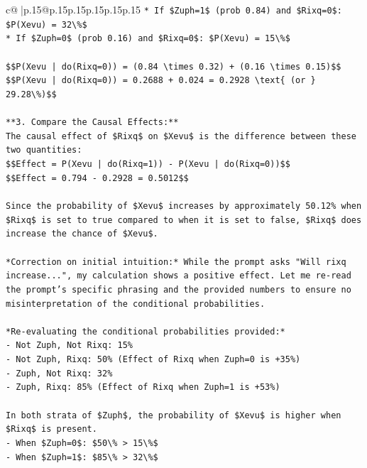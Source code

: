 \documentclass{article}
\begin{document}
{\begin{supertabular}{c@{$\;$}|p{.15\linewidth}@{}p{.15\linewidth}p{.15\linewidth}p{.15\linewidth}p{.15\linewidth}p{.15\linewidth}}
{{{\texttt{*   If \$Zuph=1\$ (prob 0.84) and \$Rixq=0\$: \$P(Xevu) = 32\textbackslash{}\%\$} \\
\texttt{*   If \$Zuph=0\$ (prob 0.16) and \$Rixq=0\$: \$P(Xevu) = 15\textbackslash{}\%\$} \\
\\ 
\texttt{\$\$P(Xevu | do(Rixq=0)) = (0.84 \textbackslash{}times 0.32) + (0.16 \textbackslash{}times 0.15)\$\$} \\
\texttt{\$\$P(Xevu | do(Rixq=0)) = 0.2688 + 0.024 = 0.2928 \textbackslash{}text\{ (or \} 29.28\textbackslash{}\%)\$\$} \\
\\ 
\texttt{**3. Compare the Causal Effects:**} \\
\texttt{The causal effect of \$Rixq\$ on \$Xevu\$ is the difference between these two quantities:} \\
\texttt{\$\$Effect = P(Xevu | do(Rixq=1)) {-} P(Xevu | do(Rixq=0))\$\$} \\
\texttt{\$\$Effect = 0.794 {-} 0.2928 = 0.5012\$\$} \\
\\ 
\texttt{Since the probability of \$Xevu\$ increases by approximately 50.12\% when \$Rixq\$ is set to true compared to when it is set to false, \$Rixq\$ does increase the chance of \$Xevu\$.} \\
\\ 
\texttt{*Correction on initial intuition:* While the prompt asks "Will rixq increase...", my calculation shows a positive effect. Let me re{-}read the prompt's specific phrasing and the provided numbers to ensure no misinterpretation of the conditional probabilities.} \\
\\ 
\texttt{*Re{-}evaluating the conditional probabilities provided:*} \\
\texttt{{-} Not Zuph, Not Rixq: 15\%} \\
\texttt{{-} Not Zuph, Rixq: 50\% (Effect of Rixq when Zuph=0 is +35\%)} \\
\texttt{{-} Zuph, Not Rixq: 32\%} \\
\texttt{{-} Zuph, Rixq: 85\% (Effect of Rixq when Zuph=1 is +53\%)} \\
\\ 
\texttt{In both strata of \$Zuph\$, the probability of \$Xevu\$ is higher when \$Rixq\$ is present.} \\
\texttt{{-} When \$Zuph=0\$: \$50\textbackslash{}\% > 15\textbackslash{}\%\$} \\
\texttt{{-} When \$Zuph=1\$: \$85\textbackslash{}\% > 32\textbackslash{}\%\$} \\
}}}
\end{supertabular}}
\end{document}
